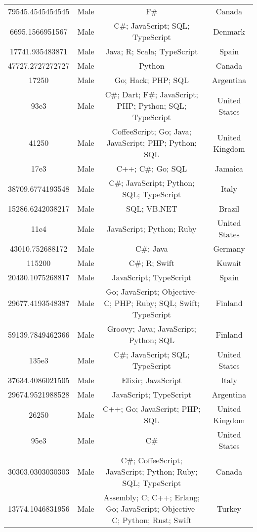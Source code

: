 \begin{center}
\begin{tabular}{ |c|c|c|c| }
79545.4545454545  &  Male  &  F\#  &  Canada  \\ 
6695.1566951567  &  Male  &  C\#; JavaScript; SQL; TypeScript  &  Denmark  \\ 
17741.935483871  &  Male  &  Java; R; Scala; TypeScript  &  Spain  \\ 
47727.2727272727  &  Male  &  Python  &  Canada  \\ 
17250  &  Male  &  Go; Hack; PHP; SQL  &  Argentina  \\ 
93e3  &  Male  &  C\#; Dart; F\#; JavaScript; PHP; Python; SQL; TypeScript  &  United States  \\ 
41250  &  Male  &  CoffeeScript; Go; Java; JavaScript; PHP; Python; SQL  &  United Kingdom  \\ 
17e3  &  Male  &  C++; C\#; Go; SQL  &  Jamaica  \\ 
38709.6774193548  &  Male  &  C\#; JavaScript; Python; SQL; TypeScript  &  Italy  \\ 
15286.6242038217  &  Male  &  SQL; VB.NET  &  Brazil  \\ 
11e4  &  Male  &  JavaScript; Python; Ruby  &  United States  \\ 
43010.752688172  &  Male  &  C\#; Java  &  Germany  \\ 
115200  &  Male  &  C\#; R; Swift  &  Kuwait  \\ 
20430.1075268817  &  Male  &  JavaScript; TypeScript  &  Spain  \\ 
29677.4193548387  &  Male  &  Go; JavaScript; Objective-C; PHP; Ruby; SQL; Swift; TypeScript  &  Finland  \\ 
59139.7849462366  &  Male  &  Groovy; Java; JavaScript; Python; SQL  &  Finland  \\ 
135e3  &  Male  &  C\#; JavaScript; SQL; TypeScript  &  United States  \\ 
37634.4086021505  &  Male  &  Elixir; JavaScript  &  Italy  \\ 
29674.9521988528  &  Male  &  JavaScript; TypeScript  &  Argentina  \\ 
26250  &  Male  &  C++; Go; JavaScript; PHP; SQL  &  United Kingdom  \\ 
95e3  &  Male  &  C\#  &  United States  \\ 
30303.0303030303  &  Male  &  C\#; CoffeeScript; JavaScript; Python; Ruby; SQL; TypeScript  &  Canada  \\ 
13774.1046831956  &  Male  &  Assembly; C; C++; Erlang; Go; JavaScript; Objective-C; Python; Rust; Swift  &  Turkey  \\ 

\end{tabular}
\end{center}
